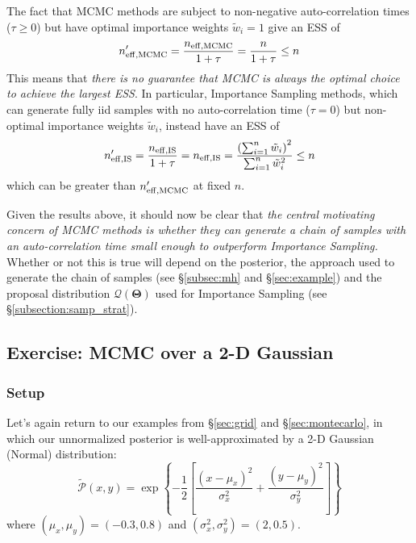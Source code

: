 \documentclass[12pt, titlepage]{article}
\newcommand{\params}{\ensuremath{\boldsymbol\Theta}}
\newcommand{\posterior}{\ensuremath{\mathcal{P}}}
\newcommand{\proposal}{\ensuremath{\mathcal{Q}}}
\begin{document}
The fact that MCMC methods are subject to non-negative
auto-correlation times ($\tau \geq 0$) but have optimal importance
weights $\tilde{w}_i = 1$ give an ESS of
\begin{equation}
    n_{\rm eff,MCMC}' = \frac{n_{\rm eff,MCMC}}{1 + \tau}
    = \frac{n}{1 + \tau} \leq n
\end{equation}
This means that \textit{there is no guarantee
that MCMC is always the optimal choice to achieve
the largest ESS}. In particular,
Importance Sampling methods, which can generate
fully iid samples with no auto-correlation time ($\tau = 0$)
but non-optimal importance weights $\tilde{w}_i$, instead have
an ESS of
\begin{equation}
    n_{\rm eff,IS}' = \frac{n_{\rm eff,IS}}{1 + \tau}
    = n_{\rm eff,IS} 
    = \frac{\left(\sum_{i=1}^{n} \tilde{w}_i\right)^2}
    {\sum_{i=1}^{n} \tilde{w}_i^2} \leq n
\end{equation}
which can be greater than $n_{\rm eff, MCMC}'$ at fixed $n$.

Given the results above, it should now be clear
that \textit{the central motivating concern of MCMC methods
is whether they can generate a chain of samples
with an auto-correlation time small enough to outperform
Importance Sampling.} Whether or not
this is true will depend on the posterior, the approach used to generate
the chain of samples (see \S\ref{subsec:mh} and \S\ref{sec:example})
and the proposal distribution $\proposal(\params)$ 
used for Importance Sampling (see \S\ref{subsection:samp_strat}).

\subsection*{Exercise: MCMC over a 2-D Gaussian} \label{exercise:mcmc}

\subsubsection*{Setup}

Let's again return to our examples from 
\S\ref{sec:grid} and \S\ref{sec:montecarlo}, in which
our unnormalized posterior is well-approximated by a 2-D Gaussian (Normal)
distribution:
\begin{equation*}
    \tilde{\posterior}(x,y) 
    = \exp\left\{-\frac{1}{2}\left[\frac{(x-\mu_x)^2}{\sigma_x^2}
    + \frac{(y-\mu_y)^2}{\sigma_y^2}\right]\right\}
\end{equation*}
where $(\mu_x,\mu_y)=(-0.3,0.8)$ and $(\sigma_x^2,\sigma_y^2)=(2,0.5)$.
\end{document}
